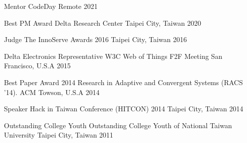 
\begin{cvhonors}

  \cvhonor
    {Mentor} %
    {CodeDay} %
    {Remote} %
    {2021} %

  \cvhonor
    {Best PM Award} %
    {Delta Research Center} %
    {Taipei City, Taiwan} %
    {2020} %

  \cvhonor
    {Judge} %
    {The InnoServe Awards 2016} %
    {Taipei City, Taiwan} %
    {2016} %

  \cvhonor
    {Delta Electronics Representative} %
    {W3C Web of Things F2F Meeting} %
    {San Francisco, U.S.A} %
    {2015} %

  \cvhonor
    {Best Paper Award} %
    {2014 Research in Adaptive and Convergent Systems (RACS '14). ACM} %
    {Towson, U.S.A} %
    {2014} %

  \cvhonor
    {Speaker} %
    {Hack in Taiwan Conference (HITCON) 2014} %
    {Taipei City, Taiwan} %
    {2014} %

  \cvhonor
    {Outstanding College Youth} %
    {Outstanding College Youth of National Taiwan University} %
    {Taipei City, Taiwan} %
    {2011} %

\end{cvhonors}
